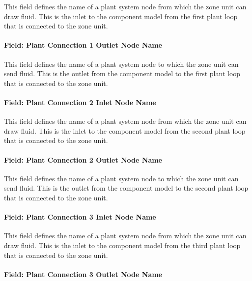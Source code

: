 This field defines the name of a plant system node from which the zone unit can draw fluid. This is the inlet to the component model from the first plant loop that is connected to the zone unit.

\paragraph{Field: Plant Connection 1 Outlet Node Name}\label{field-plant-connection-1-outlet-node-name}

This field defines the name of a plant system node to which the zone unit can send fluid. This is the outlet from the component model to the first plant loop that is connected to the zone unit.

\paragraph{Field: Plant Connection 2 Inlet Node Name}\label{field-plant-connection-2-inlet-node-name}

This field defines the name of a plant system node from which the zone unit can draw fluid. This is the inlet to the component model from the second plant loop that is connected to the zone unit.

\paragraph{Field: Plant Connection 2 Outlet Node Name}\label{field-plant-connection-2-outlet-node-name}

This field defines the name of a plant system node to which the zone unit can send fluid. This is the outlet from the component model to the second plant loop that is connected to the zone unit.

\paragraph{Field: Plant Connection 3 Inlet Node Name}\label{field-plant-connection-3-inlet-node-name}

This field defines the name of a plant system node from which the zone unit can draw fluid. This is the inlet to the component model from the third plant loop that is connected to the zone unit.

\paragraph{Field: Plant Connection 3 Outlet Node Name}\label{field-plant-connection-3-outlet-node-name}

